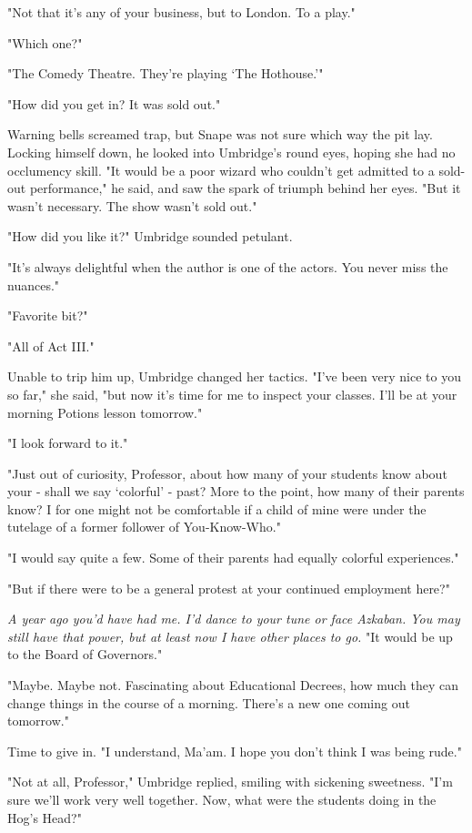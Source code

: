 \documentclass[a4paper,11pt]{article}
\begin{document}
"Not that it's any of your business, but to London. To a play."

"Which one?"

"The Comedy Theatre. They're playing `The Hothouse.'"

"How did you get in? It was sold out."

Warning bells screamed trap, but Snape was not sure which way the pit lay. Locking himself down, he looked into Umbridge's round eyes, hoping she had no occlumency skill. "It would be a poor wizard who couldn't get admitted to a sold-out performance," he said, and saw the spark of triumph behind her eyes. "But it wasn't necessary. The show wasn't sold out."

"How did you like it?" Umbridge sounded petulant.

"It's always delightful when the author is one of the actors. You never miss the nuances."

"Favorite bit?"

"All of Act III."

Unable to trip him up, Umbridge changed her tactics. "I've been very nice to you so far," she said, "but now it's time for me to inspect your classes. I'll be at your morning Potions lesson tomorrow."

"I look forward to it."

"Just out of curiosity, Professor, about how many of your students know about your - shall we say `colorful' - past? More to the point, how many of their parents know? I for one might not be comfortable if a child of mine were under the tutelage of a former follower of You-Know-Who."

"I would say quite a few. Some of their parents had equally colorful experiences."

"But if there were to be a general protest at your continued employment here?"

\emph{A year ago you'd have had me. I'd dance to your tune or face Azkaban. You may still have that power, but at least now I have other places to go.} "It would be up to the Board of Governors."

"Maybe. Maybe not. Fascinating about Educational Decrees, how much they can change things in the course of a morning. There's a new one coming out tomorrow."

Time to give in. "I understand, Ma'am. I hope you don't think I was being rude."

"Not at all, Professor," Umbridge replied, smiling with sickening sweetness. "I'm sure we'll work very well together. Now, what were the students doing in the Hog's Head?"
\end{document}
